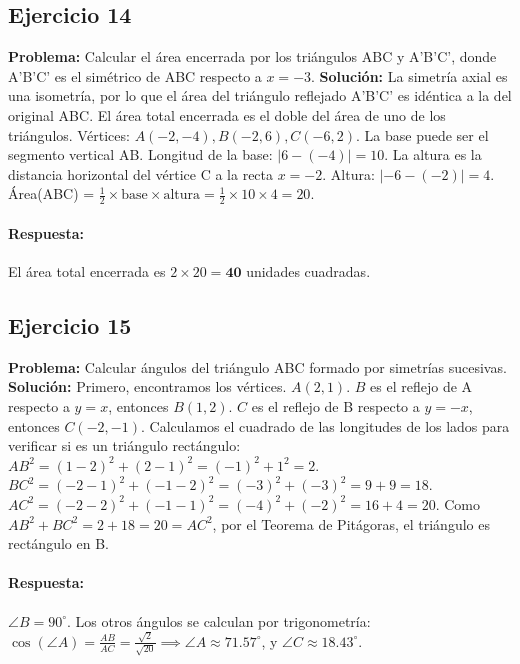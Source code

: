 \documentclass[12pt, letterpaper]{article}
\begin{document}
\subsection{Ejercicio 14}
\textbf{Problema:} Calcular el área encerrada por los triángulos ABC y A'B'C', donde A'B'C' es el simétrico de ABC respecto a $x=-3$.
\textbf{Solución:} La simetría axial es una isometría, por lo que el área del triángulo reflejado A'B'C' es idéntica a la del original ABC. El área total encerrada es el doble del área de uno de los triángulos.
Vértices: $A(-2,-4), B(-2,6), C(-6,2)$.
La base puede ser el segmento vertical AB. Longitud de la base: $|6 - (-4)| = 10$.
La altura es la distancia horizontal del vértice C a la recta $x=-2$. Altura: $|-6 - (-2)| = 4$.
Área(ABC) = $\frac{1}{2} \times \text{base} \times \text{altura} = \frac{1}{2} \times 10 \times 4 = 20$.
\paragraph{Respuesta:} El área total encerrada es $2 \times 20 = \mathbf{40}$ unidades cuadradas.

\subsection{Ejercicio 15}
\textbf{Problema:} Calcular ángulos del triángulo ABC formado por simetrías sucesivas.
\textbf{Solución:} Primero, encontramos los vértices.
$A(2,1)$.
$B$ es el reflejo de A respecto a $y=x$, entonces $B(1,2)$.
$C$ es el reflejo de B respecto a $y=-x$, entonces $C(-2,-1)$.
Calculamos el cuadrado de las longitudes de los lados para verificar si es un triángulo rectángulo:
$AB^2 = (1-2)^2 + (2-1)^2 = (-1)^2 + 1^2 = 2$.
$BC^2 = (-2-1)^2 + (-1-2)^2 = (-3)^2 + (-3)^2 = 9+9 = 18$.
$AC^2 = (-2-2)^2 + (-1-1)^2 = (-4)^2 + (-2)^2 = 16+4 = 20$.
Como $AB^2+BC^2=2+18=20=AC^2$, por el Teorema de Pitágoras, el triángulo es rectángulo en B.
\paragraph{Respuesta:} $\angle B = 90^\circ$. Los otros ángulos se calculan por trigonometría: $\cos(\angle A) = \frac{AB}{AC} = \frac{\sqrt{2}}{\sqrt{20}} \implies \angle A \approx 71.57^\circ$, y $\angle C \approx 18.43^\circ$.
\end{document}
